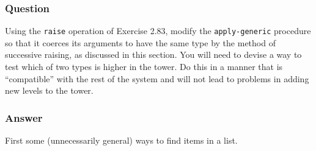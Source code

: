 \documentclass[final,fleqn,titlepage,twoside]{article}
\begin{document}
\subsubsection{Question}
\label{sec:org809f968}
Using the \texttt{raise} operation of Exercise 2.83, modify the
\texttt{apply-generic} procedure so that it coerces its arguments to have the
same type by the method of successive raising, as discussed in this section. You
will need to devise a way to test which of two types is higher in the tower. Do
this in a manner that is ``compatible'' with the rest of the system and will not
lead to problems in adding new levels to the tower.

\subsubsection{Answer}
\label{sec:org0a0aab5}
First some (unnecessarily general) ways to find items in a list.
\end{document}
